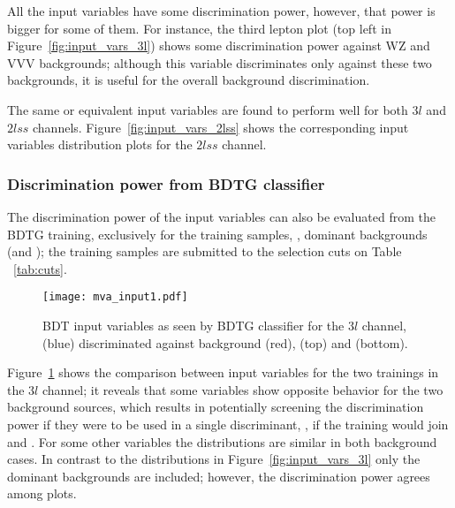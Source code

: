 All the input variables have some discrimination power, however, that power is bigger for some of them. For instance, the third lepton \pt plot (top left in Figure~\ref{fig:input_vars_3l}) shows some discrimination power against WZ and VVV backgrounds; although this variable discriminates only against these two backgrounds, it is useful for the overall background discrimination.

The same or equivalent input variables are found to perform well for both $3l$ and $2lss$ channels. Figure~\ref{fig:input_vars_2lss} shows the corresponding input variables distribution plots for the $2lss$ channel.

\subsubsection*{Discrimination power from BDTG classifier}


The discrimination power of the input variables can also be evaluated from the BDTG training, exclusively for the training samples, \ie, dominant backgrounds (\ttbar and \ttV); the training samples are submitted to the selection cuts on Table ~\ref{tab:cuts}.

\begin{figure} [!ht]
  \centering
  \texttt{[image: mva\_input1.pdf]}
  \caption[BDT input variables. Discrimination against \ttbar and \ttV\ in $3l$ channel.]{BDT input variables as seen by BDTG classifier for the $3l$ channel, \tHq (blue) discriminated against background (red), \ttbar (top) and \ttV (bottom).}
\label{fig:mva_input_comp}
\end{figure}

Figure~\ref{fig:mva_input_comp} shows the comparison between input variables for the two trainings in the $3l$ channel; it reveals that some variables show opposite behavior for the two background sources, which results in potentially screening the discrimination power if they were to be used in a single discriminant, \ie, if the training would join \ttbar and \ttV. For some other variables the distributions are similar in both background cases. In contrast to the distributions in Figure~\ref{fig:input_vars_3l} only the dominant backgrounds are included; however, the discrimination power agrees among plots.

